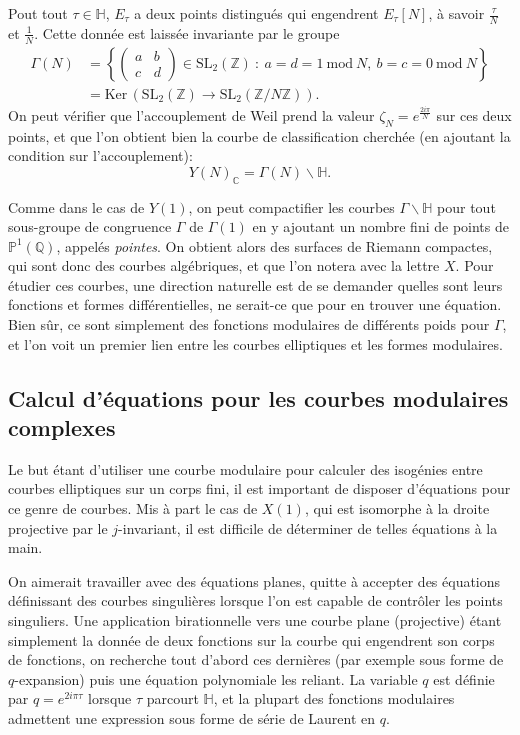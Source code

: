 \documentclass[11pt,a4paper]{article}
\newcommand{\Z}{\mathbb{Z}}
\newcommand{\C}{\mathbb{C}}
\newcommand{\Q}{\mathbb{Q}}
\renewcommand{\H}{\mathbb{H}}
\renewcommand{\P}{\mathbb{P}}
\renewcommand{\b}{\backslash}
\newcommand{\Ker}{\mathrm{Ker}\,}
\renewcommand{\mod}{\ \mathrm{mod}\ }
\renewcommand{\v}{\vspace{5mm}}
\theoremstyle{definition}
\begin{document}
Pout tout $\tau\in \H$, $E_\tau$ a deux points distingués qui engendrent $E_\tau[N]$, à savoir $\frac{\tau}{N}$ et $\frac{1}{N}$. Cette donnée est laissée invariante par le groupe
$$\begin{aligned}
\Gamma(N) &= \left\{\left(
\begin{matrix}
a & b \\
c & d
\end{matrix}
\right) \in \mathrm{SL}_2(\Z)\ :\ a = d = 1 \mod{N},\ b = c = 0\mod{N}\right\} \\
 &= \Ker(\mathrm{SL}_2(\Z) \to \mathrm{SL}_2(\Z/N\Z)).
\end{aligned}$$
On peut vérifier que l'accouplement de Weil prend la valeur $\zeta_N = e^\frac{2 i \pi}{N}$ sur ces deux points, et que l'on obtient bien la courbe de classification cherchée (en ajoutant la condition sur l'accouplement):
$$Y(N)_\C = \Gamma(N) \b \H.$$

Comme dans le cas de $Y(1)$, on peut compactifier les courbes $\Gamma \b\H$ pour tout sous-groupe de congruence $\Gamma$ de $\Gamma(1)$ en y ajoutant un nombre fini de points de $\P^1(\Q)$, appelés \emph{pointes}. On obtient alors des surfaces de Riemann compactes, qui sont donc des courbes algébriques, et que l'on notera avec la lettre $X$. Pour étudier ces courbes, une direction naturelle est de se demander quelles sont leurs fonctions et formes différentielles, ne serait-ce que pour en trouver une équation. Bien sûr, ce sont simplement des fonctions modulaires de différents poids pour $\Gamma$, et l'on voit un premier lien entre les courbes elliptiques et les formes modulaires.

\subsection{Calcul d'équations pour les courbes modulaires complexes}


Le but étant d'utiliser une courbe modulaire pour calculer des isogénies entre courbes elliptiques sur un corps fini, il est important de disposer d'équations pour ce genre de courbes. Mis à part le cas de $X(1)$, qui est isomorphe à la droite projective par le $j$-invariant, il est difficile de déterminer de telles équations à la main.

On aimerait travailler avec des équations planes, quitte à accepter des équations définissant des courbes singulières lorsque l'on est capable de contrôler les points singuliers. Une application birationnelle vers une courbe plane (projective) étant simplement la donnée de deux fonctions sur la courbe qui engendrent son corps de fonctions, on recherche tout d'abord ces dernières (par exemple sous forme de $q$-expansion) puis une équation polynomiale les reliant. La variable $q$ est définie par $q = e^{2i\pi\tau}$ lorsque $\tau$ parcourt $\H$, et la plupart des fonctions modulaires admettent une expression sous forme de série de Laurent en $q$.
\v
\end{document}

